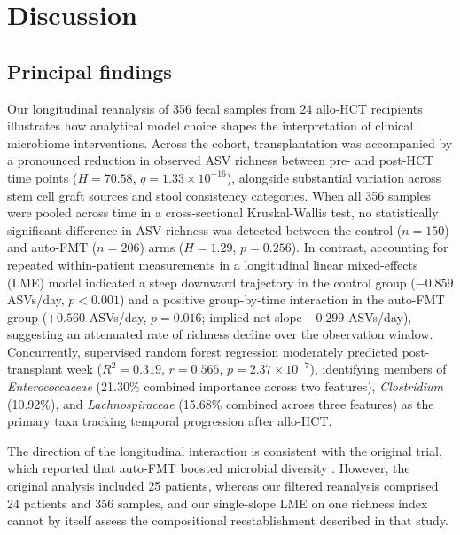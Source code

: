 
\section{Discussion}

\subsection{Principal findings}
Our longitudinal reanalysis of 356 fecal samples from 24 allo-HCT recipients illustrates how analytical model choice shapes the interpretation of clinical microbiome interventions. Across the cohort, transplantation was accompanied by a pronounced reduction in observed ASV richness between pre- and post-HCT time points ($H = 70.58$, $q = 1.33 \times 10^{-16}$), alongside substantial variation across stem cell graft sources and stool consistency categories. When all 356 samples were pooled across time in a cross-sectional Kruskal-Wallis test, no statistically significant difference in ASV richness was detected between the control ($n = 150$) and auto-FMT ($n = 206$) arms ($H = 1.29$, $p = 0.256$). In contrast, accounting for repeated within-patient measurements in a longitudinal linear mixed-effects (LME) model indicated a steep downward trajectory in the control group ($-0.859$ ASVs/day, $p < 0.001$) and a positive group-by-time interaction in the auto-FMT group ($+0.560$ ASVs/day, $p = 0.016$; implied net slope $-0.299$ ASVs/day), suggesting an attenuated rate of richness decline over the observation window. Concurrently, supervised random forest regression moderately predicted post-transplant week ($R^2 = 0.319$, $r = 0.565$, $p = 2.37 \times 10^{-7}$), identifying members of \textit{Enterococcaceae} (21.30\% combined importance across two features), \textit{Clostridium} (10.92\%), and \textit{Lachnospiraceae} (15.68\% combined across three features) as the primary taxa tracking temporal progression after allo-HCT.

The direction of the longitudinal interaction is consistent with the original trial, which reported that auto-FMT boosted microbial diversity \citep{taur2018reconstitution}. However, the original analysis included 25 patients, whereas our filtered reanalysis comprised 24 patients and 356 samples, and our single-slope LME on one richness index cannot by itself assess the compositional reestablishment described in that study.

